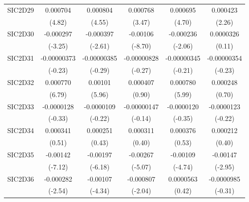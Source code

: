 \begin{table}[htbp]
\begin{tabular}{l*{5}{c}}
SIC2D29     &    0.000704\sym{***}&    0.000804\sym{***}&    0.000768\sym{***}&    0.000695\sym{***}&    0.000423\sym{*}  \\
            &      (4.82)         &      (4.55)         &      (3.47)         &      (4.70)         &      (2.26)         \\
SIC2D30     &   -0.000297\sym{**} &   -0.000397\sym{**} &    -0.00106\sym{***}&   -0.000236\sym{*}  &   0.0000326         \\
            &     (-3.25)         &     (-2.61)         &     (-8.70)         &     (-2.06)         &      (0.11)         \\
SIC2D31     & -0.00000373         & -0.00000385         & -0.00000828         & -0.00000345         & -0.00000354         \\
            &     (-0.23)         &     (-0.29)         &     (-0.27)         &     (-0.21)         &     (-0.23)         \\
SIC2D32     &    0.000770\sym{***}&     0.00101\sym{***}&    0.000407         &    0.000780\sym{***}&    0.000248         \\
            &      (6.79)         &      (5.96)         &      (0.90)         &      (5.99)         &      (0.70)         \\
SIC2D33     &  -0.0000128         &  -0.0000109         & -0.00000147         &  -0.0000120         &  -0.0000123         \\
            &     (-0.33)         &     (-0.22)         &     (-0.14)         &     (-0.35)         &     (-0.22)         \\
SIC2D34     &    0.000341         &    0.000251         &    0.000311         &    0.000376         &    0.000212         \\
            &      (0.51)         &      (0.43)         &      (0.40)         &      (0.53)         &      (0.40)         \\
SIC2D35     &    -0.00142\sym{***}&    -0.00197\sym{***}&    -0.00267\sym{***}&    -0.00109\sym{***}&    -0.00147\sym{**} \\
            &     (-7.12)         &     (-6.18)         &     (-5.07)         &     (-4.74)         &     (-2.95)         \\
SIC2D36     &   -0.000282\sym{*}  &    -0.00107\sym{***}&   -0.000807\sym{*}  &   0.0000563         &  -0.0000985         \\
            &     (-2.54)         &     (-4.34)         &     (-2.04)         &      (0.42)         &     (-0.31)         \\

\end{tabular}
\end{table}

